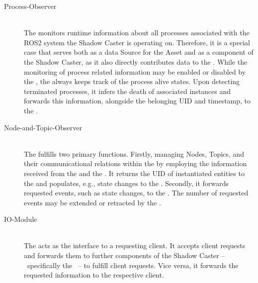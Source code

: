 \begin{description}
        \item[Process-Observer] \hfill \\
        The  monitors runtime information about all processes associated with the ROS2 system the Shadow Caster is operating on. Therefore, it is a special case that serves both as a data Source for the Asset and as a component of the Shadow Caster, as it also directly contributes data to the . While the monitoring of process related information may be enabled or disabled by the , the  always keeps track of the process alive states. Upon detecting terminated processes, it infers the death of associated instances and forwards this information, alongside the belonging UID and timestamp, to the .

        \item[Node-and-Topic-Observer] \hfill \\
        The  fulfills two primary functions. Firstly, managing Nodes, Topics, and their communicational relations within the  by employing the information received from the  and the . It returns the UID of instantiated entities to the  and populates, e.g., state changes to the .\newline
        Secondly, it forwards requested events, such as state changes, to the . The number of requested events may be extended or retracted by the .

        \item[IO-Module] \hfill \\
        The  acts as the interface to a requesting client. It accepts client requests and forwards them to further components of the Shadow Caster --~specifically the ~-- to fulfill client requests. Vice versa, it forwards the requested information to the respective client.
        

\end{description}
